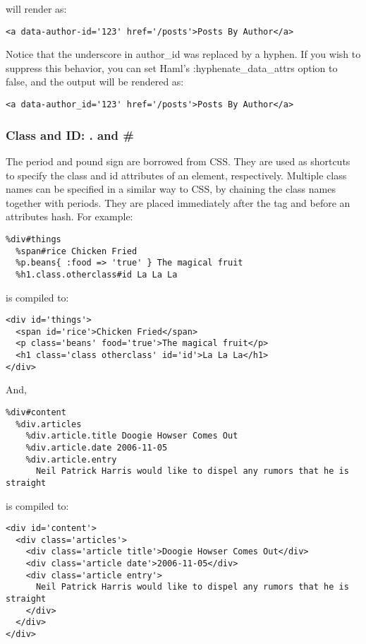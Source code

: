 \documentclass[10pt]{article}
\begin{document}
 will render as:
\begin{verbatim}
<a data-author-id='123' href='/posts'>Posts By Author</a>
\end{verbatim}


 Notice that the underscore in author\_id was replaced by a hyphen. If you wish to suppress this behavior, you can set Haml’s :hyphenate\_data\_attrs option to false, and the output will be rendered as:
\begin{verbatim}
<a data-author_id='123' href='/posts'>Posts By Author</a>
\end{verbatim}
\subsubsection*{Class and ID: . and \#}


 The period and pound sign are borrowed from CSS. They are used as shortcuts to specify the class and id attributes of an element, respectively. Multiple class names can be specified in a similar way to CSS, by chaining the class names together with periods. They are placed immediately after the tag and before an attributes hash. For example:
\begin{verbatim}
%div#things
  %span#rice Chicken Fried
  %p.beans{ :food => 'true' } The magical fruit
  %h1.class.otherclass#id La La La
\end{verbatim}


 is compiled to:
\begin{verbatim}
<div id='things'>
  <span id='rice'>Chicken Fried</span>
  <p class='beans' food='true'>The magical fruit</p>
  <h1 class='class otherclass' id='id'>La La La</h1>
</div>
\end{verbatim}


 And,
\begin{verbatim}
%div#content
  %div.articles
    %div.article.title Doogie Howser Comes Out
    %div.article.date 2006-11-05
    %div.article.entry
      Neil Patrick Harris would like to dispel any rumors that he is straight
\end{verbatim}


 is compiled to:
\begin{verbatim}
<div id='content'>
  <div class='articles'>
    <div class='article title'>Doogie Howser Comes Out</div>
    <div class='article date'>2006-11-05</div>
    <div class='article entry'>
      Neil Patrick Harris would like to dispel any rumors that he is straight
    </div>
  </div>
</div>
\end{verbatim}
\end{document}
